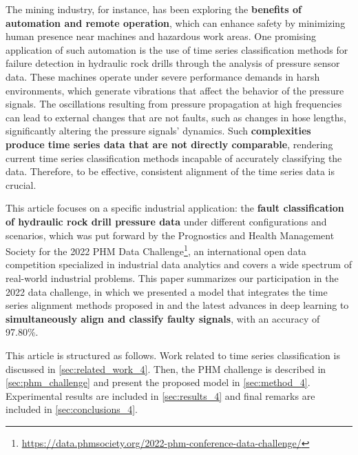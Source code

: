 The mining industry, for instance, has been exploring the \textbf{benefits of automation and remote operation}, which can enhance safety by minimizing human presence near machines and hazardous work areas. One promising application of such automation is the use of time series classification methods for failure detection in hydraulic rock drills through the analysis of pressure sensor data. These machines operate under severe performance demands in harsh environments, which generate vibrations that affect the behavior of the pressure signals.
The oscillations resulting from pressure propagation at high frequencies can lead to external changes that are not faults, such as changes in hose lengths, significantly altering the pressure signals' dynamics. Such \textbf{complexities produce time series data that are not directly comparable}, rendering current time series classification methods incapable of accurately classifying the data. Therefore, to be effective, consistent alignment of the time series data is crucial. 

This article focuses on a specific industrial application: the \textbf{fault classification of hydraulic rock drill pressure data} under different configurations and scenarios, which was put forward by the Prognostics and Health Management Society \cite{phm} for the 2022 PHM Data Challenge\footnote{\url{https://data.phmsociety.org/2022-phm-conference-data-challenge/}}, an international open data competition specialized in industrial data analytics and covers a wide spectrum of real-world industrial problems. %
This paper summarizes our participation in the 2022 data challenge, in which we presented a model that integrates the time series alignment methods proposed in \cite{martinez2022closed} and the latest advances in deep learning to \textbf{simultaneously align and classify faulty signals}, with an accuracy of 97.80\%.%


This article is structured as follows.
Work related to time series classification is discussed in \cref{sec:related_work_4}. Then, the PHM challenge is described in \cref{sec:phm_challenge} and present the proposed model in \cref{sec:method_4}. Experimental results are included in \cref{sec:results_4} and final remarks are included in \cref{sec:conclusions_4}.


